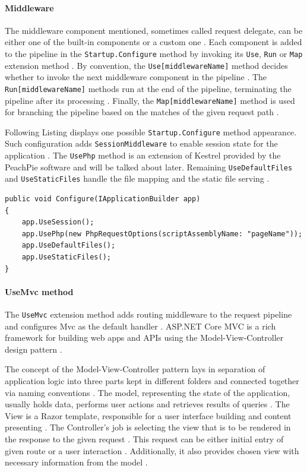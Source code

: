 \paragraph{Middleware}
The middleware component mentioned, sometimes called request delegate, can be either one of the built-in components or a custom one \citep{microsoft.docs}. Each component is added to the pipeline in the \texttt{Startup.Configure} method by invoking its \texttt{Use}, \texttt{Run} or \texttt{Map} extension method \citep{microsoft.docs}. By convention, the \texttt{Use[middlewareName]} method decides whether to invoke the next middleware component in the pipeline \citep{microsoft.docs}. The \texttt{Run[middlewareName]} methods run at the end of the pipeline, terminating the pipeline after its processing \citep{microsoft.docs}. Finally, the \texttt{Map[middlewareName]} method is used for branching the pipeline based on the matches of the given request path \citep{microsoft.docs}.

Following Listing displays one possible \texttt{Startup.Configure} method appearance. Such configuration adds \texttt{SessionMiddleware} to enable session state for the application \citep{microsoft.docs}. The \texttt{UsePhp} method is an extension of Kestrel provided by the PeachPie software and will be talked about later. Remaining \texttt{UseDefaultFiles} and \texttt{UseStaticFiles} handle the file mapping and the static file serving \citep{microsoft.docs}.
\begin{center}
\lstset{language=[Sharp]C}
\begin{lstlisting}[caption={Startup.Configure method},captionpos=b]
public void Configure(IApplicationBuilder app)
{
	app.UseSession();
	app.UsePhp(new PhpRequestOptions(scriptAssemblyName: "pageName"));
	app.UseDefaultFiles();
	app.UseStaticFiles();
}
\end{lstlisting}
\end{center}

\paragraph{UseMvc method}
The \texttt{UseMvc} extension method adds routing middleware to the request pipeline and configures Mvc as the default handler \citep{microsoft.docs}. ASP.NET Core MVC is a rich framework for building web apps and APIs using the Model-View-Controller design pattern \citep{microsoft.docs}.

The concept of the Model-View-Controller pattern lays in separation of application logic into three parts kept in different folders and connected together via naming conventions \citep{microsoft.docs}. The model, representing the state of the application, usually holds data, performs user actions and retrieves results of queries \citep{microsoft.docs}. The View is a Razor template, responsible for a user interface building and content presenting \citep{microsoft.docs}. The Controller's job is selecting the view that is to be rendered in the response to the given request \citep{microsoft.docs}. This request can be either initial entry of given route or a user interaction \citep{microsoft.docs}. Additionally, it also provides chosen view with necessary information from the model \citep{microsoft.docs}. 

